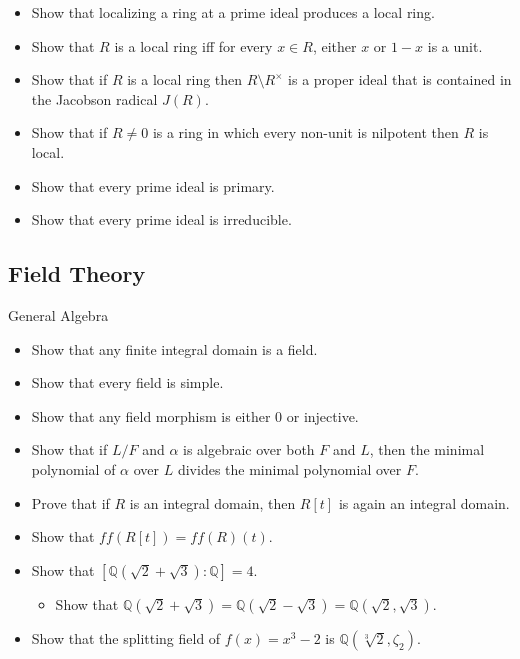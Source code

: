 \begin{itemize}
\tightlist
\item
  Show that localizing a ring at a prime ideal produces a local ring.
\item
  Show that \(R\) is a local ring iff for every \(x\in R\), either \(x\)
  or \(1-x\) is a unit.
\item
  Show that if \(R\) is a local ring then \(R\setminus R^{\times}\) is a
  proper ideal that is contained in the Jacobson radical \(J(R)\).
\item
  Show that if \(R\neq 0\) is a ring in which every non-unit is
  nilpotent then \(R\) is local.
\item
  Show that every prime ideal is primary.
\item
  Show that every prime ideal is irreducible.
\end{itemize}

\hypertarget{field-theory}{%
\subsection{Field Theory}\label{field-theory}}

General Algebra

\begin{itemize}
\tightlist
\item
  Show that any finite integral domain is a field.
\item
  Show that every field is simple.
\item
  Show that any field morphism is either 0 or injective.
\item
  Show that if \(L/F\) and \(\alpha\) is algebraic over both \(F\) and
  \(L\), then the minimal polynomial of \(\alpha\) over \(L\) divides
  the minimal polynomial over \(F\).
\item
  Prove that if \(R\) is an integral domain, then \(R[t]\) is again an
  integral domain.
\item
  Show that \(ff(R[t]) = ff(R)(t)\).
\item
  Show that \([{\mathbb{Q}}(\sqrt 2 + \sqrt 3) : {\mathbb{Q}}] = 4\).

  \begin{itemize}
  \tightlist
  \item
    Show that
    \({\mathbb{Q}}(\sqrt 2 + \sqrt 3) = {\mathbb{Q}}(\sqrt 2 - \sqrt 3) = {\mathbb{Q}}(\sqrt 2, \sqrt 3)\).
  \end{itemize}
\item
  Show that the splitting field of \(f(x) = x^3-2\) is
  \({\mathbb{Q}}(\sqrt[3]{2}, \zeta_2)\).
\end{itemize}

